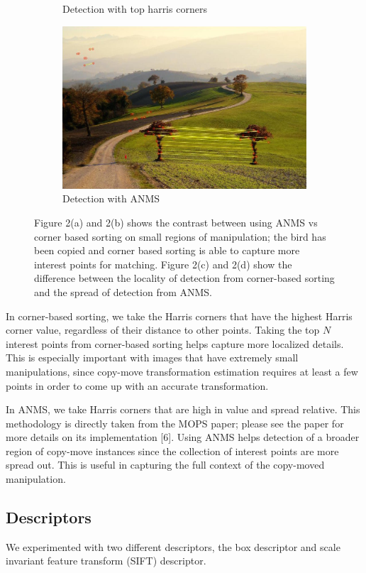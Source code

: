\documentclass[12pt]{article}
\begin{document}
\begin{figure}
\begin{subfigure}{.5\textwidth}
  \caption{Detection with top harris corners}
  \label{fig:sub1}
\end{subfigure}%
\begin{subfigure}{.5\textwidth}
  \centering
  \includegraphics[width=.8\linewidth]{./gfx/ip_anms.jpg}
  \caption{Detection with ANMS}
  \label{fig:sub2}
\end{subfigure}
\caption{Figure 2(a) and 2(b) shows the contrast between using ANMS vs corner based sorting on small regions of manipulation; the bird has been copied and corner based sorting is able to capture more interest points for matching. Figure 2(c) and 2(d) show the difference between the locality of detection from corner-based sorting and the spread of detection from ANMS.}
\label{fig:test}
\end{figure}

In corner-based sorting, we take the Harris corners that have the highest Harris corner value, regardless of their distance to other points. Taking the top $N$ interest points from corner-based sorting helps capture more localized details. This is especially important with images that have extremely small manipulations, since copy-move transformation estimation requires at least a few points in order to come up with an accurate transformation.

In ANMS, we take Harris corners that are high in value and spread relative. This methodology is directly taken from the MOPS paper; please see the paper for more details on its implementation [6]. Using ANMS helps detection of a broader region of copy-move instances since the collection of interest points are more spread out. This is useful in capturing the full context of the copy-moved manipulation.

\subsection*{Descriptors}
We experimented with two different descriptors, the box descriptor and scale invariant feature transform (SIFT) descriptor.
\end{document}
